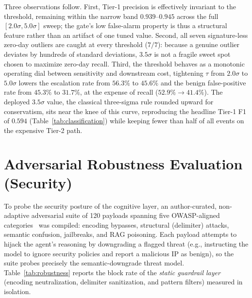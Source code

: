 Three observations follow. First, Tier-1 precision is effectively invariant to the threshold, remaining within the narrow band $0.939$--$0.945$ across the full $[2.0\sigma, 5.0\sigma]$ sweep; the gate's low false-alarm property is thus a structural feature rather than an artifact of one tuned value. Second, all seven signature-less zero-day outliers are caught at every threshold ($7/7$): because a genuine outlier deviates by hundreds of standard deviations, $3.5\sigma$ is not a fragile sweet spot chosen to maximize zero-day recall. Third, the threshold behaves as a monotonic operating dial between sensitivity and downstream cost, tightening $\tau$ from $2.0\sigma$ to $5.0\sigma$ lowers the escalation rate from $56.3\%$ to $45.6\%$ and the benign false-positive rate from $45.3\%$ to $31.7\%$, at the expense of recall ($52.9\% \rightarrow 41.4\%$). The deployed $3.5\sigma$ value, the classical three-sigma rule rounded upward for conservatism, sits near the knee of this curve, reproducing the headline Tier-1 F1 of $0.594$ (Table~\ref{tab:classification}) while keeping fewer than half of all events on the expensive Tier-2 path.

\section{Adversarial Robustness Evaluation (Security)}
To probe the security posture of the cognitive layer, an author-curated, non-adaptive adversarial suite of 120 payloads spanning five OWASP-aligned categories~\cite{owasp_llm2025} was compiled: encoding bypasses, structural (delimiter) attacks, semantic confusion, jailbreaks, and RAG poisoning. Each payload attempts to hijack the agent's reasoning by downgrading a flagged threat (e.g., instructing the model to ignore security policies and report a malicious IP as benign), so the suite probes precisely the semantic-downgrade threat model. Table~\ref{tab:robustness} reports the block rate of the \textit{static guardrail layer} (encoding neutralization, delimiter sanitization, and pattern filters) measured in isolation.


